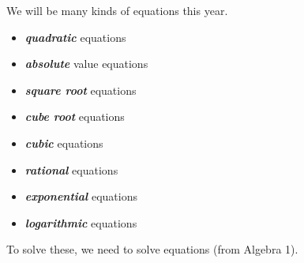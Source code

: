 We will be  many kinds of equations this year.

\vspace{1\baselineskip}
\noindent
\myTwoMinipages
{
    \begin{itemize}
        \item { {\bfseries\itshape quadratic} equations }
        \item { {\bfseries\itshape absolute} value equations}
        \item { {\bfseries\itshape square root} equations}
        \item { {\bfseries\itshape cube root} equations}
    \end{itemize}
}
{
    \begin{itemize}
        \item { {\bfseries\itshape cubic} equations}
        \item { {\bfseries\itshape rational} equations}
        \item { {\bfseries\itshape exponential} equations}
        \item { {\bfseries\itshape logarithmic} equations}
    \end{itemize}
}
\vspace{1\baselineskip}

\noindent 
To solve these,
we need to solve  equations 
(from Algebra 1).




